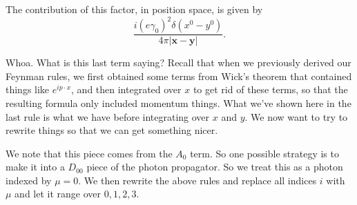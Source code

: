 \documentclass[a4paper]{article}
\begin{document}
\begin{enumerate}
\begin{center}
    \end{center}
    The contribution of this factor, in position space, is given by
    \[
      \frac{i(e \gamma_0)^2 \delta(x^0 - y^0)}{4\pi|\mathbf{x} - \mathbf{y}|}.
    \]
\end{enumerate}
Whoa. What is this last term saying? Recall that when we previously derived our Feynman rules, we first obtained some terms from Wick's theorem that contained things like $e^{ip\cdot x}$, and then integrated over $x$ to get rid of these terms, so that the resulting formula only included momentum things. What we've shown here in the last rule is what we have before integrating over $x$ and $y$. We now want to try to rewrite things so that we can get something nicer.

We note that this piece comes from the $A_0$ term. So one possible strategy is to make it into a $D_{00}$ piece of the photon propagator. So we treat this as a photon indexed by $\mu = 0$. We then rewrite the above rules and replace all indices $i$ with $\mu$ and let it range over $0, 1, 2, 3$.
\end{document}
